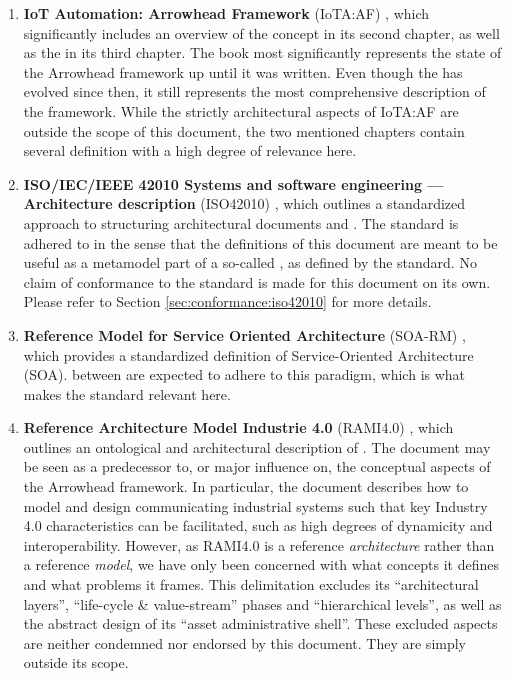 \begin{enumerate}

\item \textbf{IoT Automation: Arrowhead Framework} (IoTA:AF) \cite{delsing2017iot}, which significantly includes an overview of the  concept in its second chapter, as well as the \textit{ } in its third chapter.
The book most significantly represents the state of the Arrowhead framework up until it was written.
Even though the  has evolved since then, it still represents the most comprehensive description of the framework.
While the strictly architectural aspects of IoTA:AF are outside the scope of this document, the two mentioned chapters contain several definition with a high degree of relevance here.

\item \textbf{ISO/IEC/IEEE 42010 Systems and software engineering — Architecture description} (ISO42010) \cite{iso42010}, which outlines a standardized approach to structuring architectural documents and .
The standard is adhered to in the sense that the definitions of this document are meant to be useful as a metamodel part of a so-called , as defined by the standard.
No claim of conformance to the standard is made for this document on its own.
Please refer to Section \ref{sec:conformance:iso42010} for more details.

\item \textbf{Reference Model for Service Oriented Architecture} (SOA-RM) \cite{mackenzie2006reference}, which provides a standardized definition of Service-Oriented Architecture (SOA).
 between   are expected to adhere to this paradigm, which is what makes the standard relevant here.

\item \textbf{Reference Architecture Model Industrie 4.0} (RAMI4.0) \cite{adolphs2016reference}, which outlines an ontological and architectural description of .
The document may be seen as a predecessor to, or major influence on, the conceptual aspects of the Arrowhead framework.
In particular, the document describes how to model and design communicating industrial systems such that key Industry 4.0 characteristics can be facilitated, such as high degrees of dynamicity and interoperability.
However, as RAMI4.0 is a reference \textit{architecture} rather than a reference \textit{model}, we have only been concerned with what concepts it defines and what problems it frames.
This delimitation excludes its ``architectural layers'', ``life-cycle \& value-stream'' phases and ``hierarchical levels'', as well as the abstract design of its ``asset administrative shell''.
These excluded aspects are neither condemned nor endorsed by this document.
They are simply outside its scope.

\end{enumerate}

